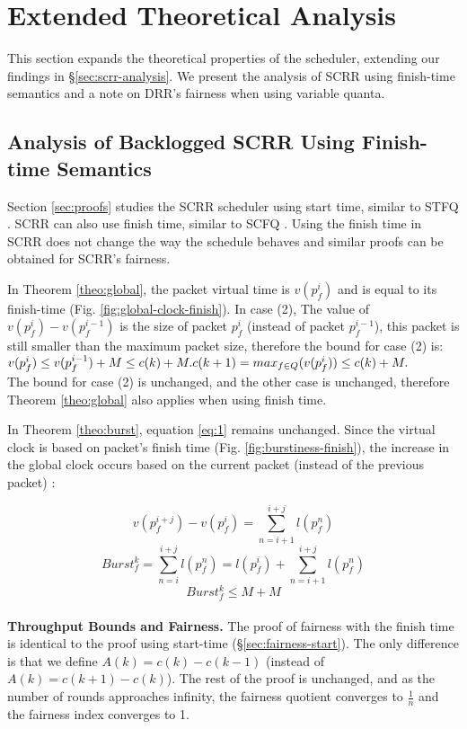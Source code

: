 \section{Extended Theoretical Analysis}

This section expands the theoretical properties of the scheduler, extending our findings in \S\ref{sec:scrr-analysis}. We present the analysis of SCRR using finish-time semantics and a note on DRR's fairness when using variable quanta.

\subsection{Analysis of Backlogged SCRR Using Finish-time Semantics}
\label{sub:clock-finish}

Section \ref{sec:proofs} studies the SCRR scheduler using start time,
similar to STFQ \cite{stfq}. SCRR can also use finish time, similar to
SCFQ \cite{scfq}. Using the finish time in SCRR does not change the way the schedule behaves and similar proofs can be obtained for SCRR's fairness.

In Theorem \ref{theo:global}, the packet virtual time is $v(p_f^i)$
and is equal to its finish-time (Fig. \ref{fig:global-clock-finish}). In case
(2), The value of $v(p_f^i) - v(p_f^{i-1})$ is the size of packet
$p_f^i$ (instead of packet $p_f^{i-1}$), this packet is still smaller
than the maximum packet size, therefore the bound for case (2) is:
\\
\begin{math}
    v(p_f^i) \leq v(p_f^{i-1}) + M \leq c(k) + M .\\
    c(k+1) = max_{f \in Q}(v(p_f^i)) \leq c(k) + M .
\end{math}
\\

The bound for case (2) is unchanged, and the other case is
unchanged, therefore Theorem \ref{theo:global} also applies when using
finish time.

In Theorem \ref{theo:burst}, equation \ref{eq:1} remains unchanged. Since the virtual clock is based on packet's finish time 
(Fig. \ref{fig:burstiness-finish}), the increase in the global clock occurs based on the current packet (instead of the previous packet) :

$$ v(p_f^{i+j}) - v(p_f^i) = \sum_{n=i+1}^{i+j} l(p_f^{n}) $$
$$ Burst^{k}_f = \sum_{n=i}^{i+j} l(p_f^{n}) = l(p_f^{i}) + \sum_{n=i+1}^{i+j} l(p_f^{n}) $$
$$ Burst^{k}_f \leq M + M$$
\\
\textbf{Throughput Bounds and Fairness.}
\label{sec:fairness-finish}
The proof of fairness with the finish time is identical to the proof
using start-time (\S\ref{sec:fairness-start}). The only
difference is that we define $A(k) = c(k) - c(k-1)$ (instead of
$A(k) = c(k+1) - c(k)$). The rest of the proof is unchanged, and as
the number of rounds approaches infinity, the fairness quotient
converges to $\frac{1}{n}$ and the fairness index converges to 1.

